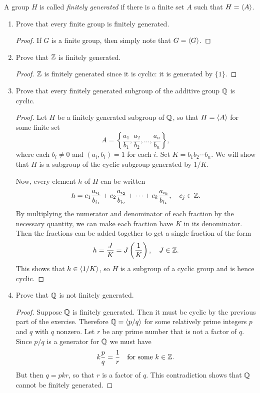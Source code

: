  A group $H$ is called {\em finitely generated} if there
is a finite set $A$ such that $H = \langle{A}\rangle$.
\begin{enumerate}
\item Prove that every finite group is finitely generated.
  \begin{proof}
    If $G$ is a finite group, then simply note that $G = \langle{G}\rangle$.
  \end{proof}
\item Prove that $\mathbb{Z}$ is finitely generated.
  \begin{proof}
    $\mathbb{Z}$ is finitely generated since it is cyclic: it is generated by
    $\{1\}$.
  \end{proof}
\item Prove that every finitely generated subgroup of the additive
  group $\mathbb{Q}$ is cyclic.
  \begin{proof}
    Let $H$ be a finitely generated subgroup of $\mathbb{Q}$, so that
    $H = \langle{A}\rangle$ for some finite set
    \begin{equation*}
      A = \left\{\frac{a_1}{b_1}, \frac{a_2}{b_2},
      \dots, \frac{a_n}{b_n}\right\},
    \end{equation*}
    where each $b_i\neq0$ and $(a_i,b_i) = 1$ for each $i$. Set
    $K = b_1b_2\cdots b_n$. We will show that $H$ is a subgroup of the
    cyclic subgroup generated by $1/K$.

    Now, every element $h$ of $H$ can be written
    \begin{equation*}
      h = c_1\frac{a_{i_1}}{b_{i_1}} + c_2\frac{a_{i_2}}{b_{i_2}}
      + \cdots + c_k\frac{a_{i_k}}{b_{i_k}},
      \quad c_j\in\mathbb{Z}.
    \end{equation*}
    By multiplying the numerator and denominator of each fraction by
    the necessary quantity, we can make each fraction have $K$ in its
    denominator. Then the fractions can be added together to get a
    single fraction of the form
    \begin{equation*}
      h = \frac{J}{K} = J\left(\frac1K\right), \quad J\in\mathbb{Z}.
    \end{equation*}
    This shows that $h\in\langle{1/K}\rangle$, so $H$ is a subgroup of a cyclic
    group and is hence cyclic.
  \end{proof}
\item Prove that $\mathbb{Q}$ is not finitely generated.
  \begin{proof}
    Suppose $\mathbb{Q}$ is finitely generated. Then it must be cyclic by the
    previous part of the exercise. Therefore $\mathbb{Q} = \langle{p/q}\rangle$ for some
    relatively prime integers $p$ and $q$ with $q$ nonzero. Let $r$ be
    any prime number that is not a factor of $q$. Since $p/q$ is a
    generator for $\mathbb{Q}$ we must have
    \begin{equation*}
      k\frac{p}{q} = \frac1r
      \quad\text{for some $k\in\mathbb{Z}$}.
    \end{equation*}
    But then $q = pkr$, so that $r$ is a factor of $q$. This
    contradiction shows that $\mathbb{Q}$ cannot be finitely generated.
  \end{proof}
\end{enumerate}

